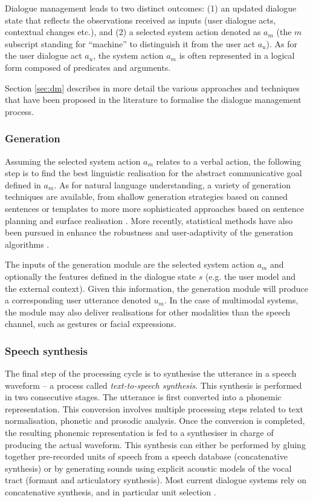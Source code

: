 Dialogue management leads to two distinct outcomes: (1) an updated dialogue state that reflects the observations received as inputs (user dialogue acts, contextual changes etc.), and (2) a selected system action denoted as $a_m$ (the $m$ subscript standing for ``machine'' to distinguish it from the user act $a_u$).  As for the user dialogue act $a_u$, the system action $a_m$ is often represented in a logical form composed of predicates and arguments. 

Section \ref{sec:dm} describes in more detail the various approaches and techniques that have been proposed in the literature to formalise the dialogue management process. 

\subsubsection*{Generation}
Assuming the selected system action $a_m$ relates to a verbal action, the following step is to find the best linguistic realisation for the abstract communicative goal defined in $a_m$.  As for natural language understanding, a variety of generation techniques are available, from shallow generation strategies based on canned sentences or templates to more more sophisticated approaches based on sentence planning and surface realisation \citep{Stone2003,koller-stone:2007}.  More recently, statistical methods have also been pursued in enhance the robustness and user-adaptivity of the generation algorithms \citep{Rieser:2010,DethlefsC11}. 

The inputs of the generation module are the selected system action $a_m$ and optionally the features defined in the dialogue state $s$ (e.g. the user model and the external context). Given this information, the generation module will produce a corresponding user utterance denoted $u_m$.  In the case of multimodal systems, the module may also deliver realisations for other modalities than the speech channel, such as gestures or facial expressions.

\subsubsection*{Speech synthesis}
The final step of the processing cycle is to synthesise the utterance in a speech waveform --  a process called \textit{text-to-speech synthesis}.  This synthesis is performed in two consecutive stages.  The utterance is first converted into a phonemic representation. This conversion involves multiple processing steps related to text normalisation, phonetic and prosodic analysis.  Once the conversion is completed, the resulting phonemic representation is fed to a synthesiser in charge of producing the actual waveform. This synthesis can either be performed by gluing together pre-recorded units of speech from a speech database (concatenative synthesis) or by generating sounds using explicit acoustic models of the vocal tract (formant and articulatory synthesis). Most current dialogue systems rely on concatenative synthesis, and in particular unit selection \citep{hunt1996}. 

